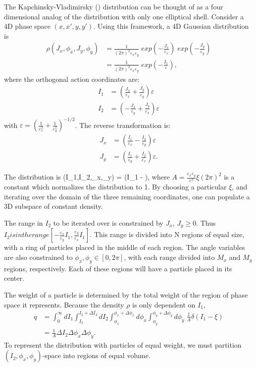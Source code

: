 The Kapchinsky-Vladimirsky () distribution can be thought of as a four dimensional analog of
the  distribution with only one elliptical shell. Consider a 4D phase space $(x,x',
y,y')$.  Using this framework, a 4D Gaussian distribution is
\begin{align}
  \rho(J_x, \phi_x, J_y, \phi_y) &= 
    \frac{1}{(2\pi)^2 \varepsilon_x \varepsilon_y}\; 
    exp(-\frac{J_x}{\varepsilon_x})\; exp(-\frac{J_y} {\varepsilon_y}) \\
  &= \frac{1}{(2\pi)^2 \varepsilon_x \varepsilon_y}\; 
    exp(-\frac{I_1}{\varepsilon}) ,
\end{align}
where the orthogonal action coordinates are:
\begin{align}
  I_1 &= \left(  \frac{J_x}{\varepsilon_x} + \frac{J_y}{\varepsilon_y} \right) \varepsilon \\
  I_2 &= \left( -\frac{J_x}{\varepsilon_y} + \frac{J_y}{\varepsilon_x} \right) \varepsilon
\end{align}
with $\varepsilon = (\frac{1}{\varepsilon_x^2} + \frac{1}{\varepsilon_y^2})^{-1/2}$.  
The reverse transformation is:
\begin{align}
   J_x & = \left( \frac{I_1}{\varepsilon_x} - \frac{I_2}{\varepsilon_y} \right) 
      \varepsilon  \\
   J_y & = \left( \frac{I_1}{\varepsilon_y} + \frac{I_2}{\varepsilon_x} \right) 
      \varepsilon.
\end{align}

The  distribution is
\Begineq
  \rho(I_1,I_2,\phi_x,\phi_y) =  \delta(I_1 - \xi),
\Endeq
where $A = \frac{\varepsilon_x \varepsilon_y}{\varepsilon^2} \xi (2\pi)^2$ 
is a constant which normalizes the distribution to 1.  
By choosing a particular $\xi$, and iterating over the domain of the three remaining
coordinates, one can populate a 3D subspace of constant density.

The range in $I_2$ to be iterated over is constrained by $J_x$, $J_y \geq 0$.  
Thus $I_2 is in the range [-\frac{\varepsilon_x}{\varepsilon_y} I_1, 
\frac{\varepsilon_y}{\varepsilon_x} I_1]$. 
This range is divided into N regions of equal size, with a ring of 
particles placed in the middle of each region.  
The angle variables are also constrained to $\phi_x, \phi_y \in [0, 2\pi]$, 
with each range divided into $M_x$ and $M_y$ regions, respectively.  
Each of these regions will have a particle placed in its center.

The weight of a particle is determined by the total weight of the region 
of phase space it represents.  
Because the density $\rho$ is only dependent on $I_1$,
\begin{align}
   q &= \int_{0}^{\infty} dI_1 \int_{I_2}^{I_2 + \Delta I_2} 
     dI_2 \int_{\phi_x}^{\phi_x + \Delta \phi_x} d\phi_x 
    \int_{\phi_y}^{\phi_y + \Delta \phi_y} d\phi_y \; \frac{1}{A} \delta(I_1 - \xi) \\
   &= \frac{1}{A} \Delta I_2 \Delta \phi_x \Delta \phi_y.
\end{align}
To represent the distribution with particles of equal weight, 
we must partition $(I_2,\phi_x,\phi_y)$-space into regions of equal volume.

